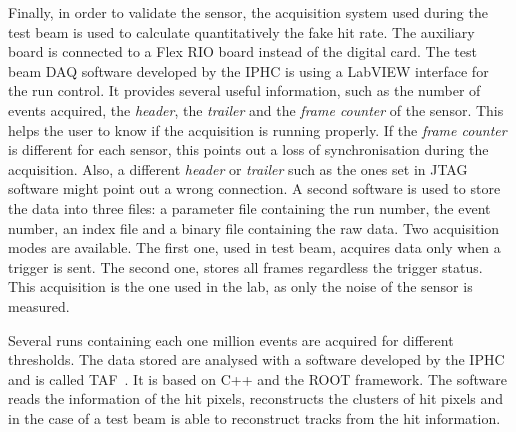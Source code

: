   Finally, in order to validate the sensor, the acquisition system used during the test beam is used to calculate quantitatively the fake hit rate.
  The auxiliary board is connected to a Flex RIO board instead of the digital card.
  The test beam \gls{DAQ} software developed by the \gls{IPHC} is using a LabVIEW interface for the run control.
  It provides several useful information, such as the number of events acquired, the \textit{header}, the \textit{trailer} and the \textit{frame counter} of the sensor.
  This helps the user to know if the acquisition is running properly.
  If the \textit{frame counter} is different for each sensor, this points out a loss of synchronisation during the acquisition.
  Also, a different \textit{header} or \textit{trailer} such as the ones set in JTAG software might point out a wrong connection.
  A second software is used to store the data into three files: a parameter file containing the run number, the event number, an index file and a binary file containing the raw data.
  Two acquisition modes are available. 
  The first one, used in test beam, acquires data only when a trigger is sent.
  The second one, stores all frames regardless the trigger status. 
  This acquisition is the one used in the lab, as only the noise of the sensor is measured.
   
  Several runs containing each one million events are acquired for different thresholds. 
  The data stored are analysed with a software developed by the \gls{IPHC} and is called \gls{TAF}~\cite{TAF2015}.
  It is based on C++ and the ROOT framework.
  The software reads the information of the hit pixels, reconstructs the clusters of hit pixels and in the case of a test beam is able to reconstruct tracks from the hit information.

